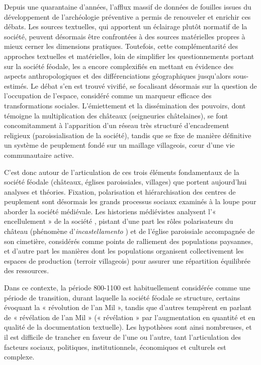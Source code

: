 Depuis une quarantaine d'années, l'afflux massif de données de fouilles issues du développement de l'archéologie préventive a permis de renouveler et enrichir ces débats.
Les sources textuelles, qui apportent un éclairage plutôt normatif de la société, peuvent désormais être confrontées à des sources matérielles propres à mieux cerner les dimensions pratiques.
Toutefois, cette complémentarité des approches textuelles et matérielles, loin de simplifier les questionnements portant sur la société féodale, les a encore complexifiés en mettant en évidence des aspects anthropologiques et des différenciations géographiques jusqu'alors sous-estimés.
Le débat s'en est trouvé vivifié, se focalisant désormais sur la question de l'occupation de l'espace, considéré comme un marqueur efficace des transformations sociales.
L'émiettement et la dissémination des pouvoirs, dont témoigne la multiplication des châteaux (seigneuries châtelaines), se font concomitamment à l'apparition d'un réseau très structuré d'encadrement religieux (paroissialisation de la société), tandis que se fixe de manière définitive un système de peuplement fondé sur un maillage villageois, cœur d'une vie communautaire active.

C'est donc autour de l'articulation de ces trois éléments fondamentaux de la société féodale (châteaux, églises paroissiales, villages) que portent aujourd'hui analyses et théories.
Fixation, polarisation et hiérarchisation des centres de peuplement sont désormais les grands processus sociaux examinés à la loupe pour aborder la société médiévale.
Les historiens médiévistes analysent l'« encellulement » de la société \autocite{fossier_enfance_1982}, pistant d'une part les rôles polarisateurs du château (phénomène d'\textit{incastellamento} \autocite{toubert_les_1973}) et de l'église paroissiale accompagnée de son cimetière, considérés comme points de ralliement des populations paysannes, et d'autre part les manières dont les populations organisent collectivement les espaces de production (terroir villageois) pour assurer une répartition équilibrée des ressources.

Dans ce contexte, la période 800-1100 est habituellement considérée comme une période de transition, durant laquelle la société féodale se structure, certains évoquant la « révolution de l'an Mil »\autocite{fossier_enfance_1982}, tandis que d'autres tempèrent en parlant de « révélation de l'an Mil » \autocite{barthelemy_societe_1993}(« révélation » par l'augmentation en quantité et en qualité de la documentation textuelle).
Les hypothèses sont ainsi nombreuses, et il est difficile de trancher en faveur de l'une ou l'autre, tant l'articulation des facteurs sociaux, politiques, institutionnels, économiques et culturels est complexe.

